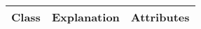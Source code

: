 																			



\centering
\begin{longtable}{l|l|l} 
Class    & Explanation                                                                                                                                                & Attributes                                                                                                                                                                                                                                                                                                                                                                                                                                                                                                                                                                                                                                                                                                                                                                                                                                                                                                                                                                                                                                                                                                                                                                                                                                                                                                                     \\ 
\hline

\end{longtable}

